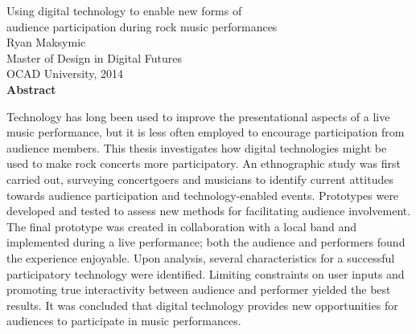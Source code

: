 \begin{center}
{Using digital technology to enable new forms of\\audience participation during rock music performances\\[0.25cm]
Ryan Maksymic\\[0.25cm]
Master of Design in Digital Futures\\[0.25cm]
OCAD University, 2014\\[0.75cm]
\large\textbf{Abstract}}\\
\end{center}

Technology has long been used to improve the presentational aspects of a live music performance, but it is less often employed to encourage participation from audience members. This thesis investigates how digital technologies might be used to make rock concerts more participatory. An ethnographic study was first carried out, surveying concertgoers and musicians to identify current attitudes towards audience participation and technology-enabled events. Prototypes were developed and tested to assess new methods for facilitating audience involvement. The final prototype was created in collaboration with a local band and implemented during a live performance; both the audience and performers found the experience enjoyable. Upon analysis, several characteristics for a successful participatory technology were identified. Limiting constraints on user inputs and promoting true interactivity between audience and performer yielded the best results. It was concluded that digital technology provides new opportunities for audiences to participate in music performances.

